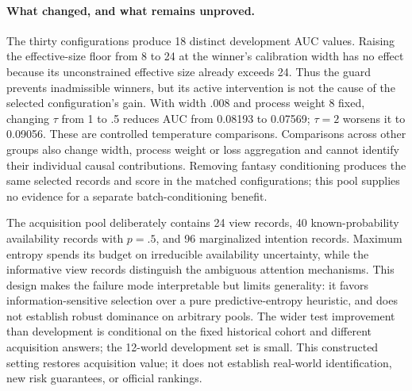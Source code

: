 \paragraph{What changed, and what remains unproved.}
The thirty configurations produce 18 distinct development AUC values. Raising the effective-size floor from 8 to 24 at the winner's calibration width has no effect because its unconstrained effective size already exceeds 24. Thus the guard prevents inadmissible winners, but its active intervention is not the cause of the selected configuration's gain. With width .008 and process weight 8 fixed, changing $\tau$ from 1 to .5 reduces AUC from 0.08193 to 0.07569; $\tau=2$ worsens it to 0.09056. These are controlled temperature comparisons. Comparisons across other groups also change width, process weight or loss aggregation and cannot identify their individual causal contributions. Removing fantasy conditioning produces the same selected records and score in the matched configurations; this pool supplies no evidence for a separate batch-conditioning benefit.

The acquisition pool deliberately contains 24 view records, 40 known-probability availability records with $p=.5$, and 96 marginalized intention records. Maximum entropy spends its budget on irreducible availability uncertainty, while the informative view records distinguish the ambiguous attention mechanisms. This design makes the failure mode interpretable but limits generality: it favors information-sensitive selection over a pure predictive-entropy heuristic, and does not establish robust dominance on arbitrary pools. The wider test improvement than development is conditional on the fixed historical cohort and different acquisition answers; the 12-world development set is small. This constructed setting restores acquisition value; it does not establish real-world identification, new risk guarantees, or official rankings.
